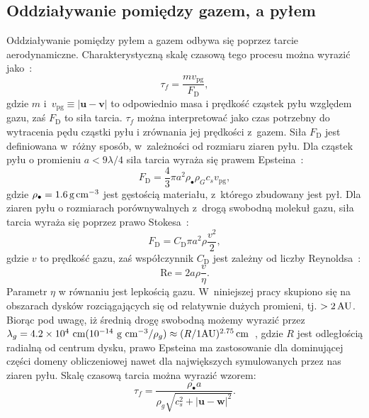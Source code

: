 \subsection{Oddziaływanie pomiędzy gazem, a pyłem}
Oddziaływanie pomiędzy pyłem a gazem odbywa się poprzez tarcie aerodynamiczne.
Charakterystyczną skalę czasową tego procesu można wyrazić jako~\cite{W73}:
%
\begin{equation}
   \tau_f = \frac{mv_\textrm{pg}}{F_\textrm{D}},
\end{equation}
%
gdzie $m$ i~$v_{\textrm{pg}}\equiv|\mathbf{u} - \mathbf{v}|$ to odpowiednio masa
i prędkość cząstek pyłu względem gazu, zaś $F_\textrm{D}$ to siła tarcia.
$\tau_f$ można interpretować jako czas potrzebny do wytracenia pędu cząstki pyłu
i zrównania jej prędkości z~gazem. Siła $F_\textrm{D}$ jest definiowana w~różny
sposób, w~zależności od rozmiaru ziaren pyłu. Dla cząstek pyłu o promieniu $a < 9
\lambda / 4$ siła tarcia wyraża się prawem Epsteina~\cite{W77}:
%
\begin{equation}
   F_\textrm{D} = \frac{4}{3}\pi a^2 \rho_\bullet \rho_G c_s v_\textrm{pg}, 
\end{equation}
%
gdzie $\rho_\bullet = 1.6\hbox{$\thinspace\textrm{g}$}\hbox{$\thinspace\textrm{cm}$}^{-3}$ jest gęstością materiału, z~którego
zbudowany jest pył. Dla ziaren pyłu o rozmiarach porównywalnych z~drogą swobodną
molekuł gazu, siła tarcia wyraża się poprzez prawo Stokesa~\cite{W77}:
\begin{equation}
  F_\textrm{D} = C_\textrm{D} \pi a^2 \rho \frac{v^2}{2},
\end{equation}
gdzie $v$ to prędkość gazu, zaś współczynnik $C_\textrm{D}$ jest zależny od
liczby Reynoldsa~\cite{W77}:
\begin{equation}
   \textrm{Re} = 2 a \rho \frac{v}{\eta}.
   \label{eq:Re}
\end{equation}
Parametr $\eta$ w równaniu  jest lepkością gazu.
W~niniejszej pracy skupiono się
na obszarach dysków rozciągających się od relatywnie dużych promieni, tj.
$>2\hbox{$\thinspace\textrm{AU}$}$.  Biorąc pod uwagę, iż średnią drogę swobodną możemy wyrazić przez
$\lambda_g = 4.2\times 10^4\textrm{ cm} (10^{-14}\textrm{ g cm}^{-3}/\rho_g)
\approx (R/1 \textrm{AU})^{2.75}\hbox{$\thinspace\textrm{cm}$}$~\citep{W77,BT09}, gdzie $R$ jest odległością
radialną od centrum dysku, prawo Epsteina ma zastosowanie dla dominującej części
domeny obliczeniowej nawet dla największych symulowanych przez nas ziaren pyłu.
Skalę czasową tarcia można wyrazić wzorem:
%
\begin{equation} 
   \tau_f = \frac{\rho_\bullet a} {\rho_g \sqrt{c_s^2 +
      |\mathbf{u} - \mathbf{w}|^2 }}. \label{eq:tauf}
\end{equation}
